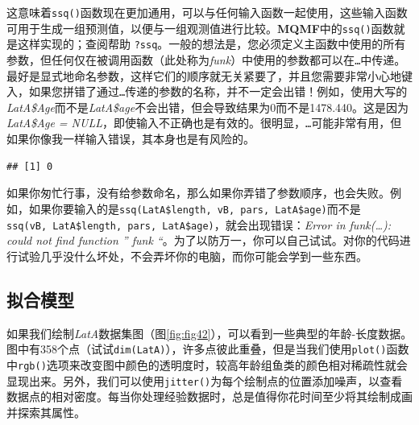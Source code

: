 \documentclass[
  lang=cn,
  11pt,
  scheme=chinese,
  chinesefont=nofont,
  citestyle=gb7714-2015,
  bibstyle=gb7714-2015]{elegantbook}
\newenvironment{Shaded}{\begin{snugshade}}{\end{snugshade}}
\newcommand{\AttributeTok}[1]{\textcolor[rgb]{0.13,0.29,0.53}{#1}}
\newcommand{\CommentTok}[1]{\textcolor[rgb]{0.56,0.35,0.01}{\textit{#1}}}
\newcommand{\FunctionTok}[1]{\textcolor[rgb]{0.13,0.29,0.53}{\textbf{#1}}}
\newcommand{\NormalTok}[1]{#1}
\newcommand{\SpecialCharTok}[1]{\textcolor[rgb]{0.81,0.36,0.00}{\textbf{#1}}}
\begin{document}
这意味着\texttt{ssq()}函数现在更加通用，可以与任何输入函数一起使用，这些输入函数可用于生成一组预测值，以便与一组观测值进行比较。\textbf{MQMF}中的\texttt{ssq()}函数就是这样实现的；查阅帮助 \texttt{?ssq}。一般的想法是，您必须定义主函数中使用的所有参数，但任何仅在被调用函数（此处称为\emph{funk}）中使用的参数都可以在\texttt{…}中传递。最好是显式地命名参数，这样它们的顺序就无关紧要了，并且您需要非常小心地键入，如果您拼错了通过\texttt{…}传递的参数的名称，并不一定会出错！例如，使用大写的\emph{LatA\$Age}而不是\emph{LatA\$age}不会出错，但会导致结果为0而不是1478.440。这是因为\emph{LatA\$Age = NULL}，即使输入不正确也是有效的。很明显，\texttt{…}可能非常有用，但如果你像我一样输入错误，其本身也是有风险的。

\begin{Shaded}
\end{Shaded}

\begin{verbatim}
## [1] 0
\end{verbatim}

如果你匆忙行事，没有给参数命名，那么如果你弄错了参数顺序，也会失败。例如，如果你要输入的是\texttt{ssq(LatA\$length,\ vB,\ pars,\ LatA\$age)}而不是\texttt{ssq(vB,\ LatA\$length,\ pars,\ LatA\$age)}，就会出现错误：\emph{Error in funk(\ldots): could not find function '' funk ``}。为了以防万一，你可以自己试试。对你的代码进行试验几乎没什么坏处，不会弄坏你的电脑，而你可能会学到一些东西。

\subsection{拟合模型}\label{ux62dfux5408ux6a21ux578b}

如果我们绘制\emph{LatA}数据集图（图\ref{fig:fig42}），可以看到一些典型的年龄-长度数据。图中有358个点（试试\texttt{dim(LatA)}），许多点彼此重叠，但是当我们使用\texttt{plot()}函数中\texttt{rgb()}选项来改变图中颜色的透明度时，较高年龄组鱼类的颜色相对稀疏性就会显现出来。另外，我们可以使用\texttt{jitter()}为每个绘制点的位置添加噪声，以查看数据点的相对密度。每当你处理经验数据时，总是值得你花时间至少将其绘制成画并探索其属性。
\end{document}
